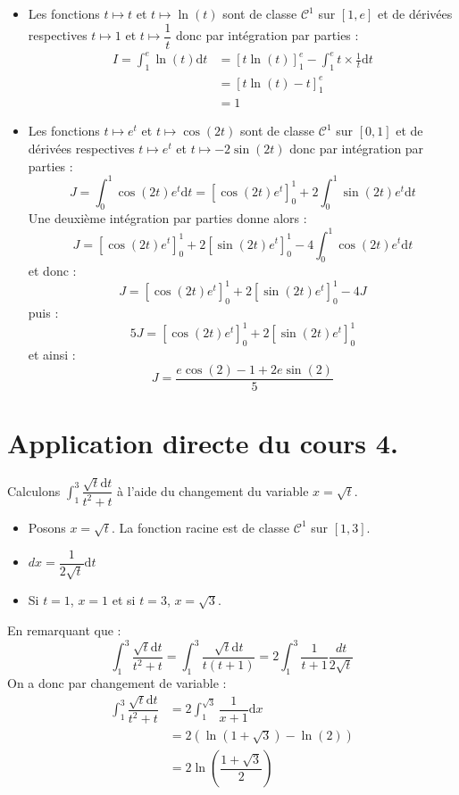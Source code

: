\documentclass[french,11pt,twoside]{VcCours}
\newcommand{\dx}{\text{d}x}
\newcommand{\dt}{\text{d}t}
\begin{document}
\begin{itemize}
\item Les fonctions $t \mapsto t$ et $t \mapsto \ln(t)$ sont de classe $\mathcal{C}^1$ sur $[1,e]$ et de dérivées respectives $t \mapsto 1$ et $t \mapsto \dfrac{1}{t}$ donc par intégration par parties :
\begin{align*}
I= \int_{1}^e \ln(t) \dt & = [t \ln(t) ]_{1}^{e} - \int_{1}^e t \times \frac{1}{t} \dt \\
& = [t \ln(t) -t]_{1}^{e} \\
& = 1 
\end{align*}
\item Les fonctions $t \mapsto e^t$ et $t \mapsto \cos(2t)$ sont de classe $\mathcal{C}^1$ sur $[0,1]$ et de dérivées respectives $t \mapsto e^t$ et $t \mapsto -2 \sin(2t)$ donc par intégration par parties :
$$J = \int_{0}^1 \cos(2t) e^t \dt  = \left[\cos(2t) e^t \right]_{0}^1 +2 \int_{0}^1 \sin(2t) e^t \dt $$
Une deuxième intégration par parties donne alors :
$$ J =  \left[\cos(2t) e^t \right]_{0}^1 +2 \left[\sin(2t) e^t \right]_{0}^1 -4  \int_{0}^1 \cos(2t) e^t \dt $$
et donc :
$$ J=  \left[\cos(2t) e^t \right]_{0}^1 +2 \left[\sin(2t) e^t \right]_{0}^1-4J$$
puis :
$$ 5J =  \left[\cos(2t) e^t \right]_{0}^1 +2 \left[\sin(2t) e^t \right]_{0}^1 $$
et ainsi :
$$ J = \dfrac{e\cos(2)-1+2e\sin(2)}{5}$$
\end{itemize}

\medskip

\section*{Application directe du cours 4.}

Calculons $\int_{1}^3 \dfrac{\sqrt{t} \dt}{t^2+t}$ à l'aide du changement du variable $x=\sqrt{t}$.

\begin{itemize}
\item Posons $x = \sqrt{t}$. La fonction racine est de classe $\mathcal{C}^1$ sur $[1,3]$.
\item $dx =\dfrac{1}{2\sqrt{t}} \dt$
\item Si $t=1$, $x=1$ et si $t=3$, $x =\sqrt{3}$.
\end{itemize}
En remarquant que :
$$ \int_{1}^3 \dfrac{\sqrt{t} \dt}{t^2+t} =  \int_{1}^3 \dfrac{\sqrt{t} \dt}{t(t+1)} =  2 \int_{1}^3 \dfrac{1}{t+1} \dfrac{dt}{2\sqrt{t}} $$
On a donc par changement de variable :
\begin{align*}
\int_{1}^3 \dfrac{\sqrt{t} \dt}{t^2+t} & = 2\int_{1}^{\sqrt{3}}  \dfrac{1}{x+1} \dx  \\
& = 2 \left(\ln( 1+ \sqrt{3})- \ln(2) \right) \\
& = 2 \ln \left( \dfrac{1+\sqrt{3}}{2} \right) 
\end{align*}
\end{document}
